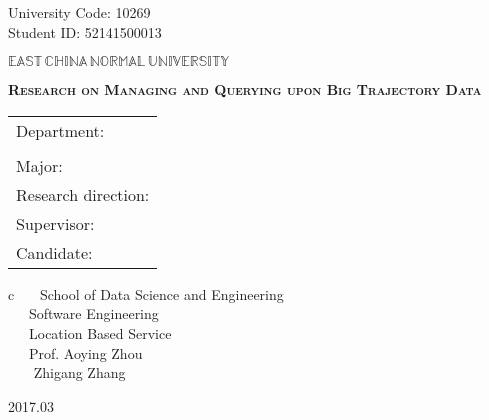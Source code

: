 \newpage

\pagestyle{empty}

\hskip 1.83cm {\large University Code: 10269}\\
\hspace*{\fill} {\large Student ID: 52141500013}

\vskip 2cm

\begin{center}
{\Huge $\mathbb{EAST}\,\mathbb{CHINA}\,\mathbb{NORMAL}\,
\mathbb{UNIVERSITY}$}
\end{center}

\vskip 3cm

\begin{center}
\bfseries{\scshape{\huge  Research on Managing and Querying  upon  Big  Trajectory Data}}\\
\end{center}

\vskip 2cm {\large
\begin{center}
\begin{tabular}{l}
Department:\\
\\
Major:\\
Research direction:\\
Supervisor:\\
Candidate:
\end{tabular}
\begin{tabular}c
~~~School of Data Science and Engineering\\
\hline ~~~Software Engineering    \\
\hline ~~~Location Based  Service\\ 
\hline ~~~Prof.  Aoying Zhou\\
\hline ~~~  Zhigang Zhang\\
\hline
\end{tabular}
\end{center}}

\vskip 30mm

\begin{center}
{\Large 2017.03}
\end{center}
\clearpage
\phantom{s}
\clearpage